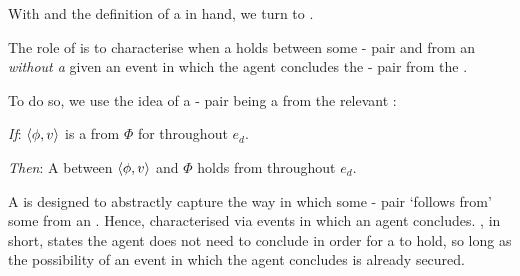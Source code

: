 \begin{note}
  With \supportI{} and the definition of a \pwitP{} in hand, we turn to \supportII{}.

  The role of \supportII{} is to characterise when a \ros{} holds between some - pair and \pool{} from an \agpe{} \emph{without a} given an event in which the agent concludes the - pair from the \pool{}.

  To do so, we use the idea of a - pair being a \fc{} from the relevant \pool{}:

  \begin{idea}[\supportII{}]%
    \label{idea:support:possible}%
    \vspace{-\baselineskip}
    \begin{itenum}
    \item[\emph{If}:]
      \(\langle \phi, v \rangle\) is a  from \(\Phi\) for \vAgent{} throughout \(e_{d}\).
    \item[\emph{Then}:]
      A \ros{} between \(\langle \phi, v \rangle\) and \(\Phi\) holds from  throughout \(e_{d}\).
    \end{itenum}
    \vspace{-\baselineskip}
  \end{idea}

  \noindent%
  A \ros{} is designed to abstractly capture the way in which some - pair `follows from' some \pool{} from an \agpe{}.
  Hence, \supportI{} characterised  via events in which an agent concludes.
  \supportII{}, in short, states the agent does not need to conclude in order for a \ros{} to hold, so long as the possibility of an event in which the agent concludes is already secured.
\end{note}


